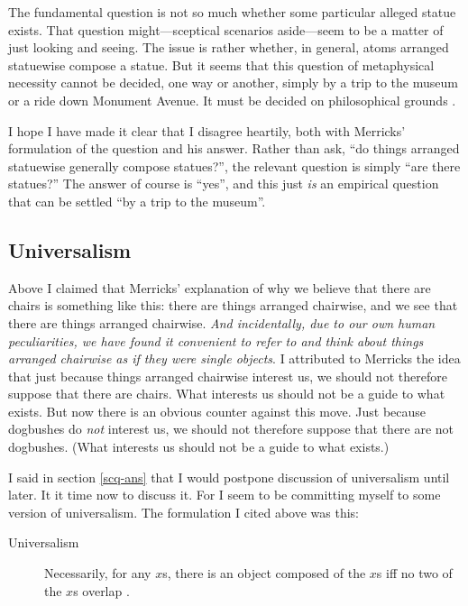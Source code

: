 \documentclass[11pt]{article}
\newenvironment{squote}{%
\begin{spacing}{1}
       	\begin{list}{}{%
\setlength{\labelwidth}{0pt}%
\rightmargin\leftmargin%
}
\item\relax
}{%
\end{list}%
\end{spacing}
}
\begin{document}
\begin{spacing}{1.25}
\begin{squote}
The fundamental question is not so much whether some particular
alleged statue exists.  That question might---sceptical scenarios
aside---seem to be a matter of just looking and seeing.  The issue is
rather whether, in general, atoms arranged statuewise compose a
statue.  But it seems that this question of metaphysical necessity
cannot be decided, one way or another, simply by a trip to the museum
or a ride down Monument Avenue.  It must be decided on philosophical
grounds \citeyearpar[9]{merricks2001a}.
\end{squote}

I hope I have made it clear that I disagree heartily, both with
Merricks' formulation of the question and his answer.  Rather than
ask, ``do things arranged statuewise generally compose statues?'', the
relevant question is simply ``are there statues?''  The answer of
course is ``yes'', and this just {\em is} an empirical question that
can be settled ``by a trip to the museum''.

\subsection{Universalism}
\label{universalism}
Above I claimed that Merricks' explanation of why we believe that
there are chairs is something like this: there are things arranged
chairwise, and we see that there are things arranged chairwise.  {\em
  And incidentally, due to our own human peculiarities, we have found
  it convenient to refer to and think about things arranged chairwise
  as if they were single objects}.  I attributed to Merricks the idea
that just because things arranged chairwise interest us, we should not
therefore suppose that there are chairs.  What interests us should not
be a guide to what exists.  But now there is an obvious counter
against this move.  Just because dogbushes do {\em not} interest us,
we should not therefore suppose that there are not dogbushes.  (What
interests us should not be a guide to what exists.)

I said in section \ref{scq-ans} that I would postpone discussion of
universalism until later.  It it time now to discuss it.  For I seem
to be committing myself to some version of universalism.  The
formulation I cited above was this:

\begin{description}
\item[Universalism] Necessarily, for any $x$s, there is an object
  composed of the $x$s iff no two of the $x$s overlap
  \citep[227]{markosian1998a}.
\end{description}


\end{spacing}
\end{document}
